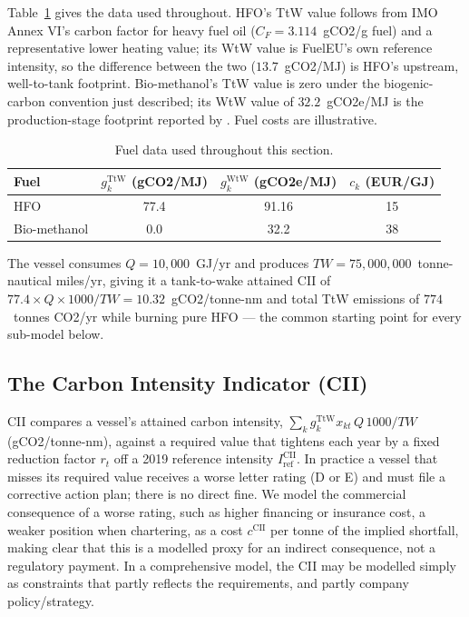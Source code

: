 Table~\ref{tab:regime-fuels} gives the data used throughout. HFO's TtW
value follows from IMO Annex VI's carbon factor for heavy fuel oil
($C_F=3.114$~gCO2/g fuel) and a representative lower heating value; its
WtW value is FuelEU's own reference intensity, so the difference between
the two ($13.7$~gCO2/MJ) is HFO's upstream, well-to-tank footprint.
Bio-methanol's TtW value is zero under the biogenic-carbon convention
just described; its WtW value of $32.2$~gCO2e/MJ is the production-stage
footprint reported by \citet{cho2027}. Fuel costs are illustrative.

\begin{table}[htbp]
\centering
\caption{Fuel data used throughout this section.}
\label{tab:regime-fuels}
\begin{tabular}{@{}lccc@{}}
\toprule
Fuel & $g_k^{\text{TtW}}$ (gCO2/MJ) & $g_k^{\text{WtW}}$ (gCO2e/MJ) & $c_k$ (EUR/GJ) \\
\midrule
HFO & 77.4 & 91.16 & 15 \\
Bio-methanol & 0.0 & 32.2 & 38 \\
\bottomrule
\end{tabular}
\end{table}

The vessel consumes $Q=10{,}000$~GJ/yr and produces
$TW=75{,}000{,}000$~tonne-nautical miles/yr, giving it a tank-to-wake
attained CII of $77.4\times Q\times1000/TW=10.32$~gCO2/tonne-nm and total
TtW emissions of $774$~tonnes CO2/yr while burning pure HFO --- the
common starting point for every sub-model below.

\subsection{The Carbon Intensity Indicator (CII)}
\label{sec:regimes-cii}

CII compares a vessel's attained carbon intensity,
$\sum_k g_k^{\text{TtW}}x_{kt}\,Q\,1000/TW$ (gCO2/tonne-nm), against a
required value that tightens each year by a fixed reduction factor $r_t$
off a 2019 reference intensity $I^{\text{CII}}_{\text{ref}}$. In
practice a vessel that misses its required value receives a worse letter
rating (D or E) and must file a corrective action plan; there is no
direct fine. We model the commercial consequence of a worse rating, such as
higher financing or insurance cost, a weaker position when chartering, as a 
cost $c^{\text{CII}}$ per tonne of the implied shortfall, making
clear that this is a modelled proxy for an indirect consequence, not a
regulatory payment. In a comprehensive model, the CII may be modelled simply as 
constraints that partly reflects the requirements, and partly company policy/strategy.

